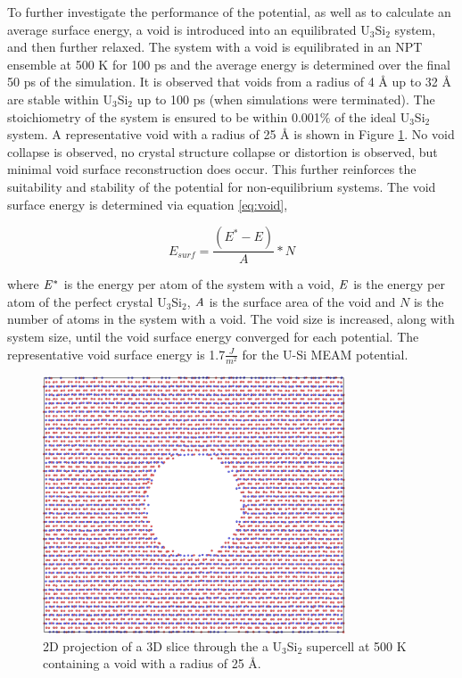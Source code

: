\documentclass[review]{elsarticle}
\begin{document}
\FloatBarrier

To further investigate the performance of the potential, as well as to calculate an average surface energy, a void is introduced into an equilibrated U$_{3}$Si$_{2}$ system, and then further relaxed.  The system with a void is equilibrated in an NPT ensemble at 500 K for 100 ps and the average energy is determined over the final 50 ps of the simulation.  It is observed that voids from a radius of 4 {\AA} up to 32 {\AA} are stable within U$_{3}$Si$_{2}$ up to 100 ps (when simulations were terminated).   The stoichiometry of the system is ensured to be within 0.001$\%$ of the ideal U$_{3}$Si$_{2}$ system.  A representative void with a radius of 25 {\AA} is shown in Figure \ref{fig:void}.  No void collapse is observed, no crystal structure collapse or distortion is observed, but minimal void surface reconstruction does occur.  This further reinforces the suitability and stability of the potential for non-equilibrium systems.  The void surface energy is determined via equation \ref{eq:void},

\begin{equation}
\label{eq:void}
E_{surf}= \frac{(E^{*} - E)}{A} * N
\end{equation}

where $\it{E^{*}}$ is the energy per atom of the system with a void, $\it{E}$ is the energy per atom of the perfect crystal U$_{3}$Si$_{2}$, $\it{A}$ is the surface area of the void and $\textit{N}$ is the number of atoms in the system with a void.  The void size is increased, along with system size, until the void surface energy converged for each potential.  The representative void surface energy is 1.7$\frac{J}{m^{2}}$ for the U-Si MEAM potential.

\begin{figure}[bt]
	\centering
	\includegraphics[width=0.8\textwidth]{void3.png}
    \caption{2D projection of a 3D slice through the a U$_{3}$Si$_{2}$ supercell at 500 K containing a void with a radius of 25 {\AA}.  }\label{fig:void}
\end{figure}
\end{document}
